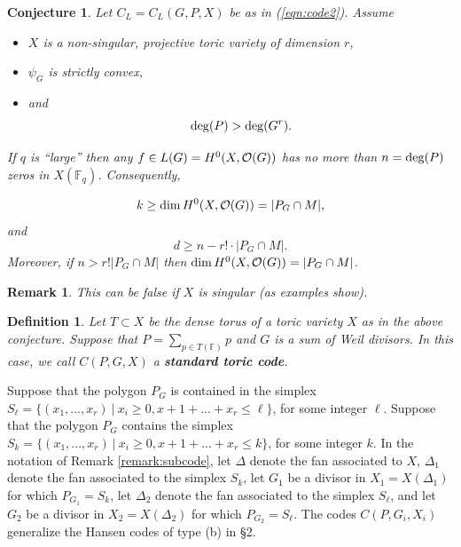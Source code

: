 \documentclass[12pt]{article}
\newtheorem{conjecture}[theorem]{Conjecture}
\newtheorem{definition}[theorem]{Definition}
\newtheorem{remark}[theorem]{Remark}
\def\fff{\mathbb{F}}
\begin{document}
\begin{conjecture}
\label{conj:main}
Let $C_L=C_L(G,P,X)$ be as in (\ref{eqn:code2}). Assume 
\begin{itemize}
\item
$X$ is a non-singular,
projective toric variety of dimension $r$, 
\item
$\psi_G$ is strictly convex,
\item
and  
\[
{\rm deg}(P)>{\rm deg}(G^r).
\]
\end{itemize}
If $q$ is ``large'' then any 
$f\in L(G)=H^0(X,{\cal O}(G))$ has no more than $n={\rm deg}(P)$ zeros
in $X(\fff_q)$.
Consequently, 

\[
k\geq {\rm dim}\, H^0(X,{\cal O}(G))=|P_G\cap M|,
\]
and
\[
d\geq n-r!\cdot |P_G\cap M|.
\]
Moreover, if $n>r! |P_G\cap M|$ then 
${\rm dim}\, H^0(X,{\cal O}(G))=|P_G\cap M|$.
\end{conjecture}

\begin{remark}
This can be false if $X$ is singular (as examples show).
\end{remark}

\begin{definition}
Let $T\subset X$ be the dense torus of a toric variety $X$
as in the above conjecture.
Suppose that $P=\sum_{p\in T(\fff)}p$ and $G$ is a sum of Weil divisors.
In this case, we call $C(P,G,X)$ a {\bf standard toric code}.
\end{definition}

Suppose that the polygon $P_G$
is contained in the simplex 
$S_\ell=\{(x_1,...,x_r)\ |\ x_i\geq 0,
x+1+...+x_r\leq \ell\}$, for some integer $\ell$. 
Suppose that the polygon $P_G$
contains the simplex $S_k=\{(x_1,...,x_r)\ |\ x_i\geq 0,
x+1+...+x_r\leq k\}$, for some integer $k$. 
In the notation of Remark \ref{remark:subcode},
let $\Delta$ denote the fan associated to $X$,
$\Delta_1$ denote the fan associated to the simplex $S_k$,
let $G_1$ be a divisor in $X_1=X(\Delta_1)$ for which
$P_{G_1}=S_k$, let
$\Delta_2$ denote the fan associated to the simplex $S_\ell$,
and let $G_2$ be a divisor in $X_2=X(\Delta_2)$ for which
$P_{G_2}=S_\ell$. The codes $C(P,G_i,X_i)$ 
generalize the Hansen codes of type (b) in \S 2.
\end{document}
